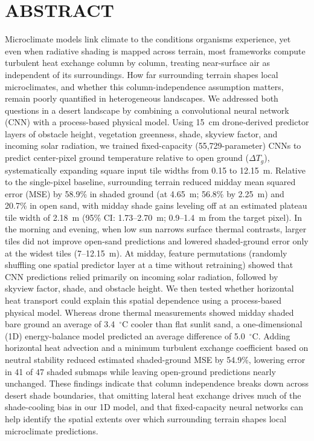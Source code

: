 \documentclass[12pt]{article}
\begin{document}
\section*{ABSTRACT}
\noindent
Microclimate models link climate to the conditions organisms experience, yet even when radiative shading is mapped across terrain, most frameworks compute turbulent heat exchange column by column, treating near-surface air as independent of its surroundings. How far surrounding terrain shapes local microclimates, and whether this column-independence assumption matters, remain poorly quantified in heterogeneous landscapes. We addressed both questions in a desert landscape by combining a convolutional neural network (CNN) with a process-based physical model. Using 15~cm drone-derived predictor layers of obstacle height, vegetation greenness, shade, skyview factor, and incoming solar radiation, we trained fixed-capacity (55,729-parameter) CNNs to predict center-pixel ground temperature relative to open ground ($\Delta T_g$), systematically expanding square input tile widths from 0.15 to 12.15~m. Relative to the single-pixel baseline, surrounding terrain reduced midday mean squared error (MSE) by 58.9\% in shaded ground (at 4.65~m; 56.8\% by 2.25~m) and 20.7\% in open sand, with midday shade gains leveling off at an estimated plateau tile width of 2.18~m (95\% CI: 1.73--2.70~m; 0.9--1.4~m from the target pixel). In the morning and evening, when low sun narrows surface thermal contrasts, larger tiles did not improve open-sand predictions and lowered shaded-ground error only at the widest tiles (7--12.15~m). At midday, feature permutations (randomly shuffling one spatial predictor layer at a time without retraining) showed that CNN predictions relied primarily on incoming solar radiation, followed by skyview factor, shade, and obstacle height. We then tested whether horizontal heat transport could explain this spatial dependence using a process-based physical model. Whereas drone thermal measurements showed midday shaded bare ground an average of 3.4~$^\circ\mathrm{C}$ cooler than flat sunlit sand, a one-dimensional (1D) energy-balance model predicted an average difference of 5.0~$^\circ\mathrm{C}$. Adding horizontal heat advection and a minimum turbulent exchange coefficient based on neutral stability reduced estimated shaded-ground MSE by 54.9\%, lowering error in 41 of 47 shaded submaps while leaving open-ground predictions nearly unchanged. These findings indicate that column independence breaks down across desert shade boundaries, that omitting lateral heat exchange drives much of the shade-cooling bias in our 1D model, and that fixed-capacity neural networks can help identify the spatial extents over which surrounding terrain shapes local microclimate predictions.
\end{document}
